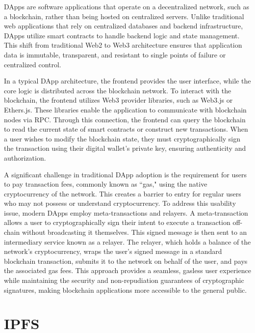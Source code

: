 \ac{DApp}s are software applications that operate on a decentralized network, such as a blockchain, rather than being hosted on centralized servers. Unlike traditional web applications that rely on centralized databases and backend infrastructure, \ac{DApp}s utilize smart contracts to handle backend logic and state management. This shift from traditional Web2 to Web3 architecture ensures that application data is immutable, transparent, and resistant to single points of failure or centralized control.

In a typical \ac{DApp} architecture, the frontend provides the user interface, while the core logic is distributed across the blockchain network. To interact with the blockchain, the frontend utilizes Web3 provider libraries, such as Web3.js or Ethers.js. These libraries enable the application to communicate with blockchain nodes via \ac{RPC}. Through this connection, the frontend can query the blockchain to read the current state of smart contracts or construct new transactions. When a user wishes to modify the blockchain state, they must cryptographically sign the transaction using their digital wallet's private key, ensuring authenticity and authorization.

A significant challenge in traditional DApp adoption is the requirement for users to pay transaction fees, commonly known as ``gas," using the native cryptocurrency of the network. This creates a barrier to entry for regular users who may not possess or understand cryptocurrency. To address this usability issue, modern DApps employ meta-transactions and relayers. A meta-transaction allows a user to cryptographically sign their intent to execute a transaction off-chain without broadcasting it themselves. This signed message is then sent to an intermediary service known as a relayer. The relayer, which holds a balance of the network's cryptocurrency, wraps the user's signed message in a standard blockchain transaction, submits it to the network on behalf of the user, and pays the associated gas fees. This approach provides a seamless, gasless user experience while maintaining the security and non-repudiation guarantees of cryptographic signatures, making blockchain applications more accessible to the general public.


\section{\ac{IPFS}}

